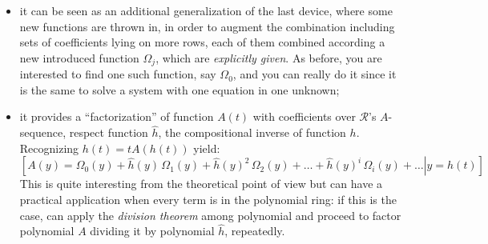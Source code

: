 \begin{itemize}
    \item it can be seen as an additional generalization of the last device,
        where some new functions are thrown in, in order to augment the
        combination including sets of coefficients lying on more rows, 
        each of them combined according a new introduced function $\Omega_{j}$,
        which are \emph{explicitly given}.  As before,
        you are interested to find one such function, say $\Omega_{0}$,
        and you can really do it since it is the same to solve a system
        with one equation in one unknown;
    \item it provides a ``factorization'' of function $A(t)$ with coefficients
        over $\mathcal{R}$'s $A$-sequence, respect function $\hat{h}$, 
        the compositional inverse of function $h$.  
        Recognizing $h(t)=tA(h(t))$ yield:
        \begin{displaymath}
            \left.\left[
                A(y) =  \Omega_{0}(y) + 
                \hat{h}(y)\,\Omega_{1}(y) + \hat{h}(y)^{2}\,\Omega_{2}(y) + \ldots +
                \hat{h}(y)^{i}\,\Omega_{i}(y) + \ldots
                \right| y = h(t) \right]
        \end{displaymath}
        This is quite interesting from the theoretical point of 
        view but can have a practical application
        when every term is in the polynomial ring: if this is the case,
        can apply the \emph{division theorem} among polynomial and 
        proceed to factor polynomial $A$ dividing it by polynomial $\hat{h}$,
        repeatedly.


\end{itemize}
